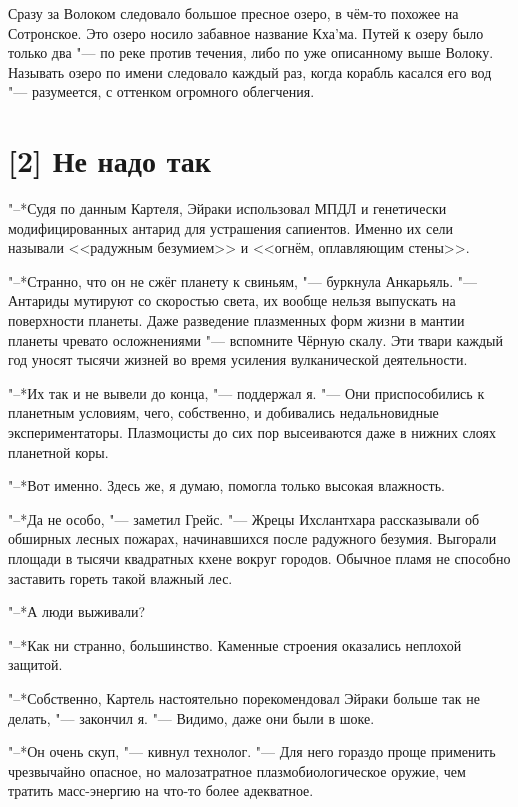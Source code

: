 Сразу за Волоком следовало большое пресное озеро, в чём-то похожее на Сотронское.
Это озеро носило забавное название Кха'ма\footnotemark.
Путей к озеру было только два "--- по реке против течения, либо по уже описанному выше Волоку.
Называть озеро по имени следовало каждый раз, когда корабль касался его вод "--- разумеется, с оттенком огромного облегчения.

\section{[2] Не надо так}

"--*Судя по данным Картеля, Эйраки использовал МПДЛ и генетически модифицированных антарид для устрашения сапиентов.
Именно их сели называли <<радужным безумием>> и <<огнём, оплавляющим стены>>.

"--*Странно, что он не сжёг планету к свиньям, "--- буркнула Анкарьяль.
"--- Антариды мутируют со скоростью света, их вообще нельзя выпускать на поверхности планеты.
Даже разведение плазменных форм жизни в мантии планеты чревато осложнениями "--- вспомните Чёрную скалу.
Эти твари каждый год уносят тысячи жизней во время усиления вулканической деятельности.

"--*Их так и не вывели до конца, "--- поддержал я.
"--- Они приспособились к планетным условиям, чего, собственно, и добивались недальновидные экспериментаторы.
Плазмоцисты до сих пор высеиваются даже в нижних слоях планетной коры.

"--*Вот именно.
Здесь же, я думаю, помогла только высокая влажность.

"--*Да не особо, "--- заметил Грейс.
"--- Жрецы Ихслантхара рассказывали об обширных лесных пожарах, начинавшихся после радужного безумия.
Выгорали площади в тысячи квадратных кхене вокруг городов.
Обычное пламя не способно заставить гореть такой влажный лес.

"--*А люди выживали?

"--*Как ни странно, большинство.
Каменные строения оказались неплохой защитой.

"--*Собственно, Картель настоятельно порекомендовал Эйраки больше так не делать, "--- закончил я.
"--- Видимо, даже они были в шоке.

"--*Он очень скуп, "--- кивнул технолог.
"--- Для него гораздо проще применить чрезвычайно опасное, но малозатратное плазмобиологическое оружие, чем тратить масс-энергию на что-то более адекватное.

